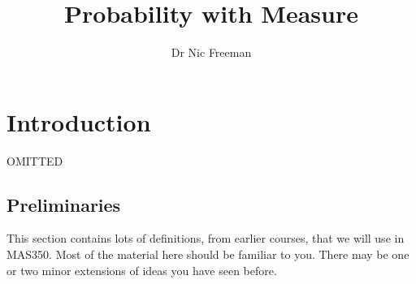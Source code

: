 \documentclass[a4paper]{report}
\title{Probability with Measure}
\author{Dr Nic Freeman}
\numberwithin{equation}{chapter}
\numberwithin{thm_counter}{section}
\begin{document}
\maketitle


\fontsize{11pt}{15.0pt}
\selectfont

\newpage \thispagestyle{empty} 

\tableofcontents

\setcounter{chapter}{-1}

\chapter{Introduction}
OMITTED

\newpage
\section{Preliminaries}

This section contains lots of definitions, from earlier courses, that we will use in MAS350. Most of the material here should be familiar to you. There may be one or two minor extensions of ideas you have seen before.
\end{document}
